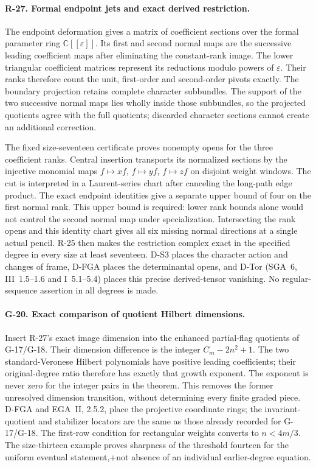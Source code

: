\paragraph{R-27. Formal endpoint jets and exact derived restriction.}
The endpoint deformation gives a matrix of coefficient sections
over the formal parameter ring $\mathbb C[[\varepsilon]]$.
Its first and second normal maps are the successive leading
coefficient maps after eliminating the constant-rank image.
The lower triangular coefficient matrices represent its
reductions modulo powers of $\varepsilon$. Their ranks therefore
count the unit, first-order and second-order pivots exactly.
The boundary projection retains complete character subbundles.
The support of the two successive normal maps lies wholly
inside those subbundles, so the projected quotients agree
with the full quotients; discarded character sections cannot
create an additional correction.

The fixed size-seventeen certificate proves nonempty opens
for the three coefficient ranks. Central insertion transports
its normalized sections by the injective monomial maps
$f\mapsto xf$, $f\mapsto yf$, $f\mapsto zf$ on disjoint
weight windows. The cut is interpreted in a Laurent-series
chart after canceling the long-path edge product. The exact
endpoint identities give a separate upper bound of four
on the first normal rank. This upper bound is required:
lower rank bounds alone would not control the second normal
map under specialization. Intersecting the rank opens and
this identity chart gives all six missing normal directions
at a single actual pencil. R-25 then makes the restriction
complex exact in the specified degree in every size at least
seventeen. D-S3 places the character action and changes of
frame, D-FGA places the determinantal opens, and D-Tor
(SGA~6, III~1.5--1.6 and I~5.1--5.4) places this precise
derived-tensor vanishing. No regular-sequence assertion in
all degrees is made.

\paragraph{G-20. Exact comparison of quotient Hilbert dimensions.}
Insert R-27's exact image dimension into the enhanced
partial-flag quotients of G-17/G-18. Their dimension difference
is the integer $C_m-2n^2+1$. The two standard-Veronese
Hilbert polynomials have positive leading coefficients;
their original-degree ratio therefore has exactly that
growth exponent. The exponent is never zero for the integer
pairs in the theorem. This removes the former unresolved
dimension transition, without determining every finite
graded piece. D-FGA and EGA~II, 2.5.2, place the projective
coordinate rings; the invariant-quotient and stabilizer
locators are the same as those already recorded for G-17/G-18.
The first-row condition for rectangular weights converts
to $n<4m/3$. The size-thirteen example proves sharpness of
the threshold fourteen for the uniform eventual statement,+not absence of an individual earlier-degree equation.

